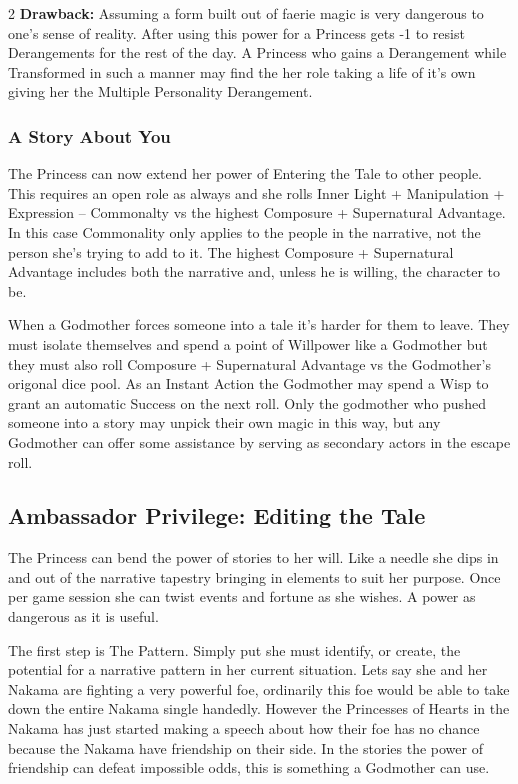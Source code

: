 \begin{multicols}{2}
\textbf{Drawback:} Assuming a form built out of faerie magic is very dangerous to one's sense of reality. After using this power for a Princess gets -1 to resist Derangements for the rest of the day. A Princess who gains a Derangement while Transformed in such a manner may find the her role taking a life of it's own giving her the Multiple Personality Derangement. 

\subsubsection*{A Story About You}

The Princess can now extend her power of Entering the Tale to other people. This requires an open role as always and she rolls Inner Light + Manipulation + Expression – Commonalty vs the highest Composure + Supernatural Advantage. In this case Commonality only applies to the people in the narrative, not the person she's trying to add to it. The highest Composure + Supernatural Advantage includes both the narrative and, unless he is willing, the character to be.

When a Godmother forces someone into a tale it's harder for them to leave. They must isolate themselves and spend a point of Willpower like a Godmother but they must also roll Composure + Supernatural Advantage vs the Godmother's origonal dice pool. As an Instant Action the Godmother may spend a Wisp to grant an automatic Success on the next roll. Only the godmother who pushed someone into a story may unpick their own magic in this way, but any Godmother can offer some assistance by serving as secondary actors in the escape roll. 

\subsection*{Ambassador Privilege: Editing the Tale}

The Princess can bend the power of stories to her will. Like a needle she dips in and out of the narrative tapestry bringing in elements to suit her purpose. Once per game session she can twist events and fortune as she wishes. A power as dangerous as it is useful.

The first step is The Pattern. Simply put she must identify, or create, the potential for a narrative pattern in her current situation. Lets say she and her Nakama are fighting a very powerful foe, ordinarily this foe would be able to take down the entire Nakama single handedly. However the Princesses of Hearts in the Nakama has just started making a speech about how their foe has no chance because the Nakama have friendship on their side. In the stories the power of friendship can defeat impossible odds, this is something a Godmother can use.


\end{multicols}
